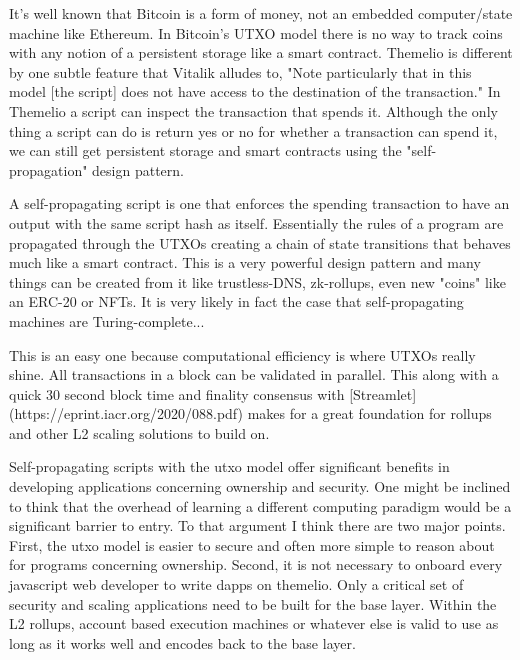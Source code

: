 It's well known that Bitcoin is a form of money, not an embedded computer/state machine like Ethereum. In Bitcoin's UTXO model there is no way to track coins with any notion of a persistent storage like a smart contract. Themelio is different by one subtle feature that Vitalik alludes to, "Note particularly that in this model [the script] does not have access to the destination of the transaction." In Themelio a script can inspect the transaction that spends it. Although the only thing a script can do is return yes or no for whether a transaction can spend it, we can still get persistent storage and smart contracts using the "self-propagation" design pattern.

A self-propagating script is one that enforces the spending transaction to have an output with the same script hash as itself. Essentially the rules of a program are propagated through the UTXOs creating a chain of state transitions that behaves much like a smart contract. This is a very powerful design pattern and many things can be created from it like trustless-DNS, zk-rollups, even new "coins" like an ERC-20 or NFTs. It is very likely in fact the case that self-propagating machines are Turing-complete...


This is an easy one because computational efficiency is where UTXOs really shine. All transactions in a block can be validated in parallel. This along with a quick 30 second block time and finality consensus with [Streamlet](https://eprint.iacr.org/2020/088.pdf) makes for a great foundation for rollups and other L2 scaling solutions to build on.

Self-propagating scripts with the utxo model offer significant benefits in developing applications concerning ownership and security. One might be inclined to think that the overhead of learning a different computing paradigm would be a significant barrier to entry. To that argument I think there are two major points. First, the utxo model is easier to secure and often more simple to reason about for programs concerning ownership. Second, it is not necessary to onboard every javascript web developer to write dapps on themelio. Only a critical set of security and scaling applications need to be built for the base layer. Within the L2 rollups, account based execution machines or whatever else is valid to use as long as it works well and encodes back to the base layer.
